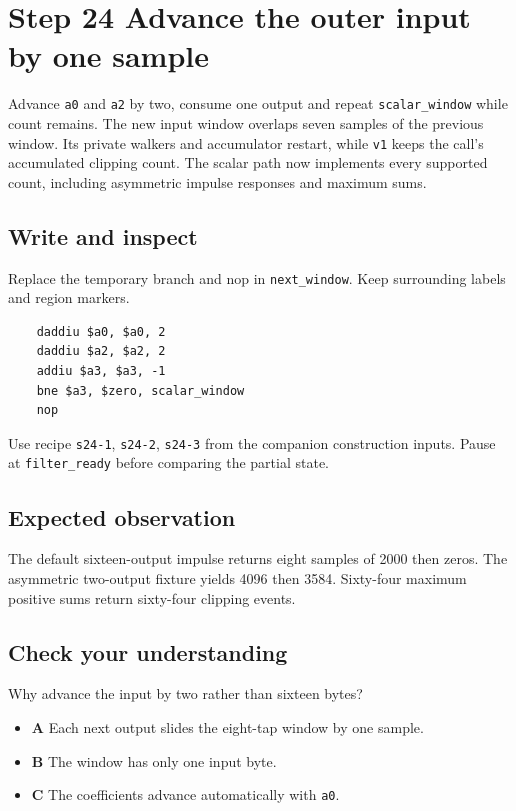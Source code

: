 \section{Step 24 Advance the outer input by one sample}\label{fir-s24}

Advance \texttt{a0} and \texttt{a2} by two, consume one output and repeat \texttt{scalar\_window} while count remains. The new input window overlaps seven samples of the previous window. Its private walkers and accumulator restart, while \texttt{v1} keeps the call’s accumulated clipping count. The scalar path now implements every supported count, including asymmetric impulse responses and maximum sums.

\subsection{Write and inspect}
Replace the temporary branch and nop in \texttt{next\_window}. Keep surrounding labels and region markers.

\begin{verbatim}
    daddiu $a0, $a0, 2
    daddiu $a2, $a2, 2
    addiu $a3, $a3, -1
    bne $a3, $zero, scalar_window
    nop
\end{verbatim}
Use recipe \texttt{s24-1}, \texttt{s24-2}, \texttt{s24-3} from the companion construction inputs. Pause at \texttt{filter\_ready} before comparing the partial state.

\subsection{Expected observation}
The default sixteen-output impulse returns eight samples of 2000 then zeros. The asymmetric two-output fixture yields 4096 then 3584. Sixty-four maximum positive sums return sixty-four clipping events.

\subsection{Check your understanding}
Why advance the input by two rather than sixteen bytes?

\begin{itemize}
\item \textbf{A} Each next output slides the eight-tap window by one sample.
\item \textbf{B} The window has only one input byte.
\item \textbf{C} The coefficients advance automatically with \texttt{a0}.
\end{itemize}

